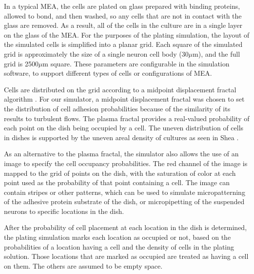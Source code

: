 \documentclass[letterpaper]{article}
\begin{document}
In a typical MEA, the cells are plated on glass prepared with binding proteins, allowed to bond, and then washed, so any cells that are not in contact with the glass are removed.
As a result, all of the cells in the culture are in a single layer on the glass of the MEA.
For the purposes of the plating simulation, the layout of the simulated cells is simplified into a planar grid. 
Each square of the simulated grid is approximately the size of a single neuron cell body (30$\mu$m), and the full grid is 2500$\mu$m square.
These parameters are configurable in the simulation software, to support different types of cells or configurations of MEA.

Cells are distributed on the grid according to a midpoint displacement fractal algorithm \cite{Fournier1982Stochastic}. 
For our simulator, a midpoint displacement fractal was chosen to set the distribution of cell adhesion probabilities because of the similarity of its results to turbulent flows. 
The plasma fractal provides a real-valued probability of each point on the dish being occupied by a cell. 
The uneven distribution of cells in dishes is supported by the uneven areal density of cultures as seen in Shea \citeyear{shea2009optimization}. 

As an alternative to the plasma fractal, the simulator also allows the use of an image to specify the cell occupancy probabilities. 
The red channel of the image is mapped to the grid of points on the dish, with the saturation of color at each point used as the probability of that point containing a cell. 
The image can contain stripes or other patterns, which can be used to simulate micropatterning of the adhesive protein substrate of the dish, or micropipetting of the suspended neurons to specific locations in the dish. 

After the probability of cell placement at each location in the dish is determined, the plating simulation marks each location as occupied or not, based on the probabilities of a location having a cell and the density of cells in the plating solution. 
Those locations that are marked as occupied are treated as having a cell on them. The others are assumed to be empty space. 
\end{document}
